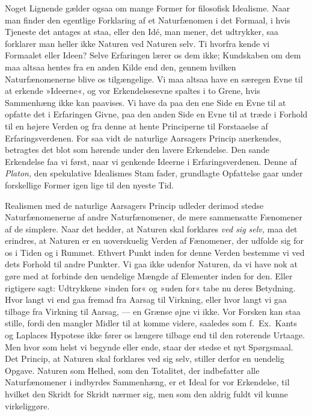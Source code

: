 \documentclass[12pt,a4paper]{article}
\newcommand{\opage}[1]{\marginnote{\footnotesize\textit{[#1]}}}
\begin{document}
Noget Lignende gælder ogsaa om mange Former for filosofisk Idealisme.
Naar man finder den egentlige Forklaring af et Naturfænomen i det
Formaal, i hvis Tjeneste det antages at staa, eller den Idé, man mener,
det udtrykker, saa forklarer man heller ikke Naturen ved Naturen selv.
Ti hvorfra kende vi Formaalet eller Ideen? Selve Erfaringen lærer os
dem ikke; Kundskaben om dem maa altsaa hentes fra en anden Kilde end
den, gennem hvilken Naturfænomenerne blive os tilgængelige. Vi maa
altsaa have en særegen Evne til at erkende »Ideerne«, og vor
Erkendelsesevne spaltes i to Grene, hvis Sammenhæng ikke kan paavises.
Vi have da paa den ene Side en Evne til at opfatte det i Erfaringen
Givne, paa den anden Side en Evne til at træde i Forhold til en højere
Verden og fra denne at hente Principerne til Forstaaelse af
Erfaringsverdenen. For saa vidt de naturlige Aarsagers Princip
anerkendes, betragtes det blot som hørende under den lavere Erkendelse.
Den sande Erkendelse faa vi først, naar vi genkende Ideerne i
Erfaringsverdenen. Denne af \emph{Platon,} den spekulative Idealismes
Stam%
\opage{4}fader, grundlagte Opfattelse gaar under forskellige Former igen
lige til den nyeste Tid.

Realismen med de naturlige Aarsagers Princip udleder derimod stedse
Naturfænomenerne af andre Naturfænomener, de mere sammensatte Fænomener
af de simplere. Naar det hedder, at Naturen skal forklares \emph{ved sig
selv,} maa det erindres, at Naturen er en uoverskuelig Verden af
Fænomener, der udfolde sig for os i Tiden og i Rummet. Ethvert Punkt
inden for denne Verden bestemme vi ved dets Forhold til andre Punkter.
Vi gaa ikke udenfor Naturen, da vi have nok at gøre med at forbinde
den uendelige Mængde af Elementer inden for den. Eller rigtigere sagt:
Udtrykkene »inden for« og »uden for« tabe nu deres Betydning. Hvor
langt vi end gaa fremad fra Aarsag til Virkning, eller hvor langt vi
gaa tilbage fra Virkning til Aarsag, --- en Grænse øjne vi ikke. Vor
Forsken kan staa stille, fordi den mangler Midler til at komme videre,
saaledes som f.\ Ex.\ Kants og Laplaces Hypotese ikke fører os længere
tilbage end til den roterende Urtaage. Men hvor som helst vi begynde
eller ende, staar der stedse et nyt Spørgsmaal. Det Princip, at Naturen
skal forklares ved sig selv, stiller derfor en uendelig Opgave. Naturen
som Helhed, som den Totalitet, der indbefatter alle Naturfænomener i
indbyrdes Sammenhæng, er et Ideal for vor Erkendelse, til hvilket den
Skridt for Skridt nærmer sig, men som den aldrig fuldt vil kunne
virkeliggøre.
\end{document}
